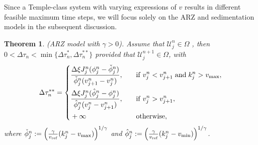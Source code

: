 \documentclass[times,final,11pt]{elsarticle}
\newtheorem{theorem}{Theorem}[section]
\numberwithin{equation}{section}
\theoremstyle{definition}
\theoremstyle{remark}
\begin{document}
Since a Temple-class system with varying expressions of $v$ results in different feasible maximum time steps, we will focus solely on the ARZ and sedimentation models in the subsequent discussion.
\begin{theorem}
	{\rm (ARZ model with $\gamma > 0$).} Assume that $\boldsymbol{\mathcal{U}}_j^{n} \in \Omega$ , then $0 < \Delta \tau_n < \min \{\Delta \tau_n^{*}, \Delta \tau_n^{**} \}$ provided that $\boldsymbol{\mathcal{U}}_j^{n + 1} \in \Omega$, with 
	\begin{equation}
	\label{09}
	    \Delta \tau_n^{**} = \left\{ 
	    \begin{aligned}
	        &\frac{\Delta \xi J_j^n (\phi_j^n - \check{\phi}_j^n)}{\check{\phi}_j^n (v_{j + 1}^n - v_{j}^n)}, \quad &&{\rm if} \; v_j^n < v_{j + 1}^n \; {\rm and} \; k_j^n > v_{\max},\\
	        &\frac{\Delta \xi J_j^n (\hat{\phi}_j^n - \phi_j^n)}{\hat{\phi}_j^n (v_{j}^n - v_{j + 1}^n)}, \quad &&{\rm if} \; v_j^n > v_{j + 1}^n,\\
	        &+ \infty \quad &&{\rm otherwise},
	    \end{aligned}
	    \right.
	\end{equation}
	where $\check{\phi}_j^n := \left(\frac{\gamma}{v_{\rm ref}} (k_j^n - v_{\max})\right)^{1 / \gamma}$ and $\hat{\phi}_j^n := \left(\frac{\gamma}{v_{\rm ref}} (k_j^n - v_{\min})\right)^{1 / \gamma}$.
\end{theorem}
\end{document}
